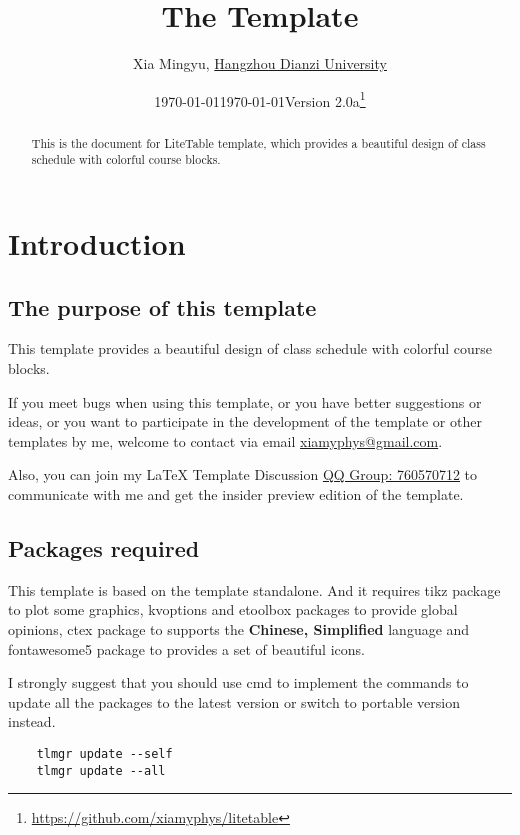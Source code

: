 \documentclass[11pt]{article}
\title{The \pkg{LiteTable} Template}
\author[1]{Xia Mingyu, \href{https://www.hdu.edu.cn}{Hangzhou Dianzi University}}
\date{\today}
\affil[1]{\href{mailto:xiamyphys@gmail.com}{\texttt{xiamyphys@gmail.com}}}
\date{\today\quad Version 2.0a\thanks{%
  \url{https://github.com/xiamyphys/litetable}}}
\makeatletter
\def\@pkg#1{\texorpdfstring{\href{https://www.ctan.org/pkg/#1}%
{\textcolor{pkgcolor}{\textsf{#1}}}}{“#1”}}
\def\s@pkg#1{\texorpdfstring{\textcolor{pkgcolor}{\textsf{#1}}}{“#1”}}
\DeclareRobustCommand\pkg{\@ifstar\s@pkg\@pkg}
\makeatother
\begin{document}
\maketitle

\begin{abstract}
This is the document for \pkg{LiteTable} template, which provides a beautiful design of class schedule with colorful course blocks.

\end{abstract}

\tableofcontents

\section{Introduction}

\subsection{The purpose of this template}
This template provides a beautiful design of class schedule with colorful course blocks.

If you meet bugs when using this template, or you have better suggestions or ideas, or you want to participate in the development of the template or other templates by me, welcome to contact via email \href{mailto:xiamyphys@gmail.com}{xiamyphys@gmail.com}.

Also, you can join my \textsf\LaTeX{} Template Discussion \href{https://qm.qq.com/q/OnHzbNvVAG}{QQ Group: 760570712} to communicate with me and get the insider preview edition of the template.

\subsection{Packages required}
This template is based on the template \pkg{standalone}. And it requires \pkg{tikz} package to plot some graphics, \pkg{kvoptions} and \pkg{etoolbox} packages to provide global opinions, \pkg{ctex} package to supports the \textbf{Chinese, Simplified} language and \pkg{fontawesome5} package to provides a set of beautiful icons.

I strongly suggest that you should use cmd to implement the commands to update all the packages to the latest version or switch to portable version instead.
\begin{verbatim}
    tlmgr update --self
    tlmgr update --all
\end{verbatim}
\end{document}
